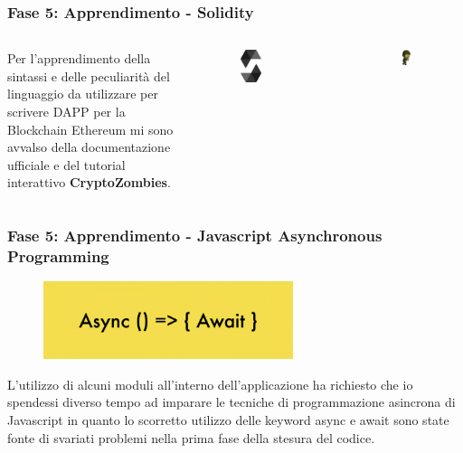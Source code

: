 \documentclass{beamer}
\begin{document}
\begin{frame}
	\frametitle{Fase 5: Apprendimento - Solidity}
	\begin{columns}
		Per l’apprendimento della sintassi e delle peculiarità del linguaggio da utilizzare per scrivere DAPP per la Blockchain Ethereum mi sono avvalso della documentazione ufficiale e del tutorial interattivo \textbf{CryptoZombies}.	
		\begin{figure}
			\includegraphics[width=0.30\textwidth]{figures/solidity.png}
		\end{figure}
		\begin{figure}
			\includegraphics[width=0.40\textwidth]{figures/zombie.png}
		\end{figure}
	\end{columns}
\end{frame}
\begin{frame}
	\frametitle{Fase 5: Apprendimento - Javascript Asynchronous Programming}	
	\begin{figure}
		\includegraphics[width=0.65\textwidth]{figures/async.jpg}
	\end{figure}
	L’utilizzo di alcuni moduli all’interno dell’applicazione ha richiesto che io spendessi diverso tempo ad imparare le tecniche di programmazione asincrona di Javascript in quanto lo scorretto utilizzo delle keyword async e await sono state fonte di svariati problemi nella prima fase della stesura del codice.
\end{frame}
\end{document}
